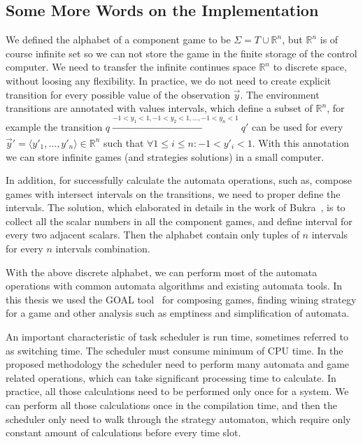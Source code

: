 \documentclass[ twoside, 12pt ]{article}
\newcommand\R{{\mathbb R}}
\begin{document}
\subsection{Some More Words on the Implementation}

We defined the alphabet of a component game to be $\Sigma = T \cup \R^n$, but $\R^n$ is of course infinite set so we can not store the game in the finite storage of the control computer.
We need to transfer the infinite continues space $\R^n$ to discrete space, without loosing any flexibility.
In practice, we do not need to create explicit transition for every possible value of the observation $\vec{y}$.
The environment transitions are annotated with values intervals, which define a subset of $\R^n$, for example the transition $q \xrightarrow[]{-1<y_1<1, -1<y_2<1, \dots , -1<y_n<1 } q'$ can be used for every $\vec{y}' = \langle y'_1, \dots , y'_n \rangle \in \R^n$ such that $\forall 1 \le i \le n : -1 < y'_i < 1$.
With this annotation we can store infinite games (and strategies solutions) in a small computer.

In addition, for successfully calculate the automata operations, such as, compose games with intersect intervals on the transitions, we need to proper define the intervals.
The solution, which elaborated in details in the work of Bukra~\cite{Merav}, is to collect all the scalar numbers in all the component games, and define interval for every two adjacent scalars. Then the alphabet contain only tuples of $n$ intervals for every $n$ intervals combination. 


With the above discrete alphabet, we can perform most of the automata operations with common automata algorithms and existing automata tools. 
In this thesis we used the GOAL tool~\cite{goal} for composing games, finding wining strategy for a game and other analysis such as emptiness and simplification of automata.

An important characteristic of task scheduler is run time, sometimes referred to as switching time.
The scheduler must consume minimum of CPU time. In the proposed methodology the scheduler need to perform many automata and game related operations, which can take significant processing time to calculate.
In practice, all those calculations need to be performed only once for a system. 
We can perform all those calculations once in the compilation time, and then the scheduler only need to walk through the strategy automaton, which require only constant amount of calculations before every time slot.
\end{document}
